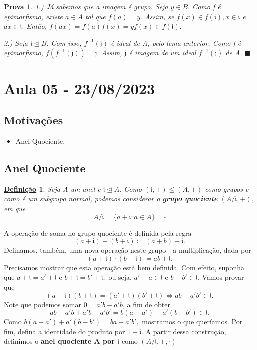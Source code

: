 \documentclass{article}
\newtheorem*{def*}{\underline{Defini\c c\~ao}}
\newtheorem*{proof*}{\underline{Prova}}
\renewcommand\qedsymbol{$\blacksquare$}
\begin{document}
\begin{proof*}
  1.) Já sabemos que a imagem é grupo. Seja \(y\in B.\) Como f é epimorfismo, existe
  \(a\in A\) tal que \(f(a) = y.\) Assim, se \(f(x)\in f(\mathfrak{i}), x\in \mathfrak{i}\) e 
  \(ax\in \mathfrak{i}.\) Então, \(f(ax) = f(a)f(x) = y f(x)\in f(\mathfrak{i}).\)

  2.) Seja \(\mathfrak{j}\trianglelefteq{B}.\) Com isso, \(f^{-1}(\mathfrak{j})\) é ideal de A, pelo lema anterior.
  Como f é epimorfismo, \(f(f^{-1}(\mathfrak{j})) = \mathfrak{j}.\) Assim, \(\mathfrak{j}\) é imagem de um ideal
  \(f^{-1}(\mathfrak{j})\) de A. \qedsymbol
\end{proof*}
\newpage

\section{Aula 05 - 23/08/2023}
\subsection{Motivações}
\begin{itemize}
  \item Anel Quociente.
\end{itemize}
\subsection{Anel Quociente}
\begin{def*}
  Seja A um anel e \(\mathfrak{i}\trianglelefteq{A}.\) Como \((\mathfrak{i}, +)\leq (A, +)\) como grupos e
  como é um subgrupo normal, podemos considerar o \textbf{grupo quociente} \((A/\mathfrak{i}, +)\), em que 
  \[
    A/\mathfrak{i} = \{a + \mathfrak{i}: a \in A\}.\quad\square
  \]
\end{def*}
A operação de soma no grupo quociente é definida pela regra 
\[
  (a+\mathfrak{i})+(b+\mathfrak{i})\coloneqq (a+b)+\mathfrak{i}.
\]
Definamos, também, uma nova operação neste grupo - a multiplicação, dada por 
\[
  (a+\mathfrak{i})\cdot (b+\mathfrak{i})\coloneqq ab + \mathfrak{i}. 
\]
Precisamos mostrar que esta operação está bem definida. Com efeito, suponha que
\(a+\mathfrak{i} = a'+\mathfrak{i}\) e \(b+\mathfrak{i} = b'+\mathfrak{i},\) ou seja,
\(a'-a\in \mathfrak{i}\) e \(b-b'\in \mathfrak{i}.\) Vamos provar que 
\[
  (a+\mathfrak{i})(b+\mathfrak{i}) = (a'+\mathfrak{i})(b'+\mathfrak{i}) \Longleftrightarrow ab - a'b'\in \mathfrak{i}.
\]
Note que podemos somar \(0=a'b-a'b\), a fim de obter 
\[
  ab - a'b + a'b - a'b' = b(a-a') + a'(b-b')\in \mathfrak{i}.
\] 
Como \(b(a-a') + a'(b-b') = ba - a'b',\) mostramos o que queríamos. Por fim,
defina a identidade do produto por \(1 + \mathfrak{i}.\) A partir dessa construção,
definimos o \textbf{anel quociente A por \(\mathfrak{i}\)} como \((A/\mathfrak{i}, +, \cdot )\)
\end{document}
